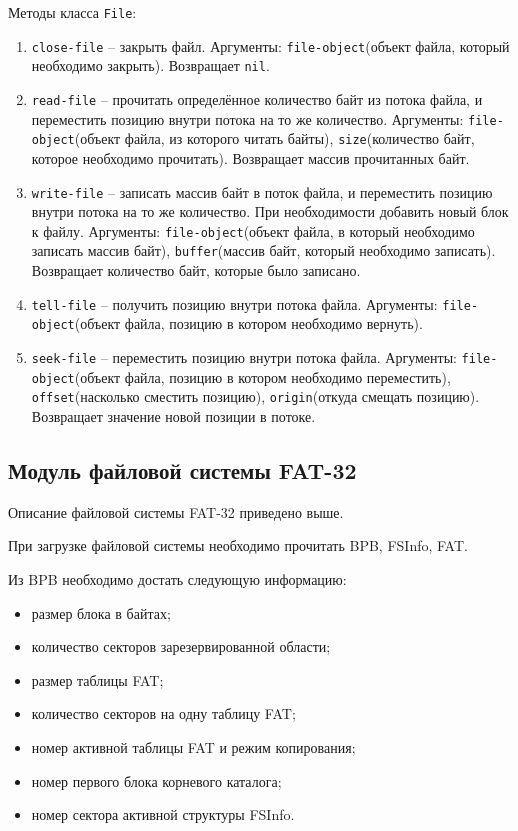 \begin{enumerate}
	Методы класса \texttt{File}:
	
	\begin{enumerate}
		\item \texttt{close-file} -- закрыть файл. Аргументы: \texttt{file-object}(объект файла, который необходимо закрыть). Возвращает \texttt{nil}.
		\item \texttt{read-file} -- прочитать определённое количество байт из потока файла, и переместить позицию внутри потока на то же количество. Аргументы: \texttt{file-object}(объект файла, из которого читать байты), \texttt{size}(количество байт, которое необходимо прочитать). Возвращает массив прочитанных байт.
		\item \texttt{write-file} -- записать массив байт в поток файла, и переместить позицию внутри потока на то же количество. При необходимости добавить новый блок к файлу. Аргументы: \texttt{file-object}(объект файла, в который необходимо записать массив байт), \texttt{buffer}(массив байт, который необходимо записать). Возвращает количество байт, которые было записано.
		\item \texttt{tell-file} -- получить позицию внутри потока файла. Аргументы: \texttt{file-object}(объект файла, позицию в котором необходимо вернуть).
		\item \texttt{seek-file} -- переместить позицию внутри потока файла. Аргументы: \texttt{file-object}(объект файла, позицию в котором необходимо переместить), \texttt{offset}(насколько сместить позицию), \texttt{origin}(откуда смещать позицию). Возвращает значение новой позиции в потоке.
	\end{enumerate}
	
\end{enumerate}

\subsection{Модуль файловой системы FAT-32}

Описание файловой системы FAT-32 приведено выше.

При загрузке файловой системы необходимо прочитать BPB, FSInfo, FAT.

Из BPB необходимо достать следующую информацию:

\begin{itemize}
\item размер блока в байтах;
\item количество секторов зарезервированной области;
\item размер таблицы FAT;
\item количество секторов на одну таблицу FAT;
\item номер активной таблицы FAT и режим копирования;
\item номер первого блока корневого каталога;
\item номер сектора активной структуры FSInfo.
\end{itemize}

